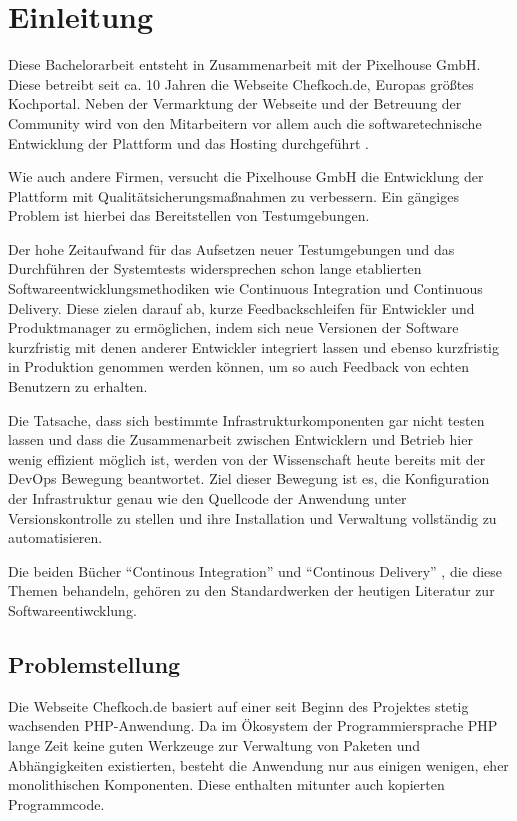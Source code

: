 \section{Einleitung}

Diese Bachelorarbeit entsteht in Zusammenarbeit mit der Pixelhouse GmbH. Diese betreibt seit ca. 10 Jahren die Webseite Chefkoch.de, Europas größtes Kochportal. Neben der Vermarktung der Webseite und der Betreuung der Community wird von den Mitarbeitern vor allem auch die softwaretechnische Entwicklung der Plattform und das Hosting durchgeführt \citep[Vgl.][]{pixelhouse14}.

Wie auch andere Firmen, versucht die Pixelhouse GmbH die Entwicklung der Plattform mit Qualitätsicherungsmaßnahmen zu verbessern. Ein gängiges Problem ist hierbei das Bereitstellen von Testumgebungen.

Der hohe Zeitaufwand für das Aufsetzen neuer Testumgebungen und das Durchführen der Systemtests widersprechen schon lange etablierten Softwareentwicklungsmethodiken wie Continuous Integration und Continuous Delivery. Diese zielen darauf ab, kurze Feedbackschleifen für Entwickler und Produktmanager zu ermöglichen, indem sich neue Versionen der Software kurzfristig mit denen anderer Entwickler integriert lassen und ebenso kurzfristig in Produktion genommen werden können, um so auch Feedback von echten Benutzern zu erhalten.

Die Tatsache, dass sich bestimmte Infrastrukturkomponenten gar nicht testen lassen und dass die Zusammenarbeit zwischen Entwicklern und Betrieb hier wenig effizient möglich ist, werden von der Wissenschaft heute bereits mit der DevOps Bewegung beantwortet. Ziel dieser Bewegung ist es, die Konfiguration der Infrastruktur genau wie den Quellcode der Anwendung unter Versionskontrolle zu stellen und ihre Installation und Verwaltung vollständig zu automatisieren.

Die beiden Bücher "`Continous Integration"' \citep{DuvMatAnd07} und "`Continous Delivery"' \citep{HumFar10}, die diese Themen behandeln, gehören zu den Standardwerken der heutigen Literatur zur Softwareentiwcklung.

\subsection{Problemstellung}

Die Webseite Chefkoch.de basiert auf einer seit Beginn des Projektes stetig wachsenden PHP-Anwendung. Da im Ökosystem der Programmiersprache PHP lange Zeit keine guten Werkzeuge zur Verwaltung von Paketen und Abhängigkeiten existierten, besteht die Anwendung nur aus einigen wenigen, eher monolithischen Komponenten. Diese enthalten mitunter auch kopierten Programmcode.

